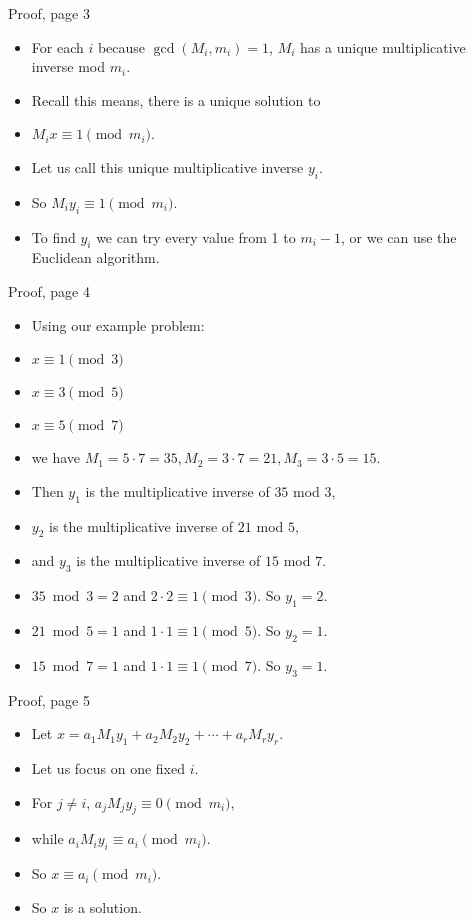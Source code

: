 \documentclass[handout]{beamer}
\begin{document}
\begin{frame}{Proof, page 3}

\begin{itemize}
  \item For each $i$ because $\gcd(M_i, m_i)=1$, $M_i$ has a unique multiplicative inverse mod $m_i$.
  \item Recall this means, there is a unique solution to
  \item $M_i x \equiv 1 \pmod {m_i}$.
  \item Let us call this unique multiplicative inverse $y_i$.
  \item So $M_i y_i \equiv 1 \pmod {m_i}$.
  \item To find $y_i$ we can try every value from 1 to $m_i-1$, or we can use the Euclidean algorithm.
\end{itemize}

\end{frame}

\begin{frame}{Proof, page 4}

\begin{itemize}
  \item Using our example problem:
  \item $x \equiv 1 \pmod 3$
  \item $x \equiv 3 \pmod 5$
  \item $x \equiv 5 \pmod 7$
  \item we have $M_1 = 5\cdot 7 = 35, M_2 = 3\cdot 7 = 21, M_3 = 3\cdot 5 = 15$.
  \item Then $y_1$ is the multiplicative inverse of $35$ mod $3$,
  \item $y_2$ is the multiplicative inverse of $21$ mod $5$,
  \item and $y_3$ is the multiplicative inverse of $15$ mod $7$.
  \item $35 \bmod 3 =2$ and $2\cdot 2 \equiv 1 \pmod 3$. So $y_1 = 2$.
  \item $21 \bmod 5 = 1$ and  $1\cdot 1 \equiv 1 \pmod 5$. So $y_2 = 1$.
  \item $15 \bmod 7 = 1$ and $1\cdot 1 \equiv 1 \pmod 7$. So $y_3 = 1$.
\end{itemize}

\end{frame}

\begin{frame}{Proof, page 5}

\begin{itemize}
  \item Let $x = a_1 M_1 y_1 + a_2 M_2 y_2 + \cdots + a_r M_r y_r$.
  \item Let us focus on one fixed $i$.
  \item For $j\not=i$, $a_j M_j y_j \equiv 0 \pmod {m_i}$,
  \item while $a_i M_i y_i \equiv a_i \pmod {m_i}$.
  \item So $x \equiv a_i \pmod {m_i}$.
  \item So $x$ is a solution.
\end{itemize}

\end{frame}
\end{document}
